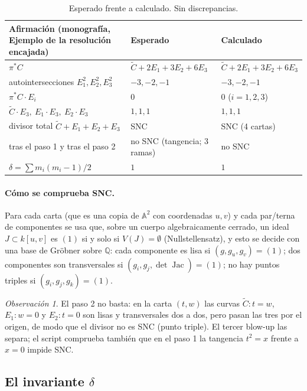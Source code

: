 \documentclass[11pt,a4paper]{article}
\newcommand{\A}{\mathbb{A}}
\newcommand{\QQ}{\mathbb{Q}}
\theoremstyle{plain}
\theoremstyle{definition}
\theoremstyle{remark}
\newtheorem{observacion}[teorema]{Observación}
\begin{document}
\begin{table}[ht]
\centering
\small
\begin{tabular}{@{}p{6.2cm} p{4.3cm} p{4.3cm}@{}}
\toprule
Afirmación (monografía, Ejemplo de la resolución encajada) & Esperado & Calculado \\
\midrule
$\pi^*C$ & $\tilde C+2E_1+3E_2+6E_3$ & $\tilde C+2E_1+3E_2+6E_3$ \\
autointersecciones $E_1^2,E_2^2,E_3^2$ & $-3,-2,-1$ & $-3,-2,-1$ \\
$\pi^*C\cdot E_i$ & $0$ & $0$ ($i=1,2,3$) \\
$\tilde C\cdot E_3,\ E_1\cdot E_3,\ E_2\cdot E_3$ & $1,1,1$ & $1,1,1$ \\
divisor total $\tilde C+E_1+E_2+E_3$ & SNC & SNC (4 cartas) \\
tras el paso 1 y tras el paso 2 & no SNC (tangencia; 3 ramas) & no SNC \\
$\delta=\sum m_i(m_i-1)/2$ & $1$ & $1$ \\
\bottomrule
\end{tabular}
\caption{Esperado frente a calculado. Sin discrepancias.}
\end{table}

\paragraph{Cómo se comprueba SNC.} Para cada carta (que es una copia de $\A^2$ con coordenadas $u,v$) y cada par/terna de componentes se usa que, sobre un cuerpo algebraicamente cerrado, un ideal $J\subset k[u,v]$ es $(1)$ si y solo si $V(J)=\emptyset$ (Nullstellensatz), y esto se decide con una base de Gröbner sobre $\QQ$: cada componente es lisa si $(g,g_u,g_v)=(1)$; dos componentes son transversales si $(g_i,g_j,\det\operatorname{Jac})=(1)$; no hay puntos triples si $(g_i,g_j,g_k)=(1)$.

\begin{observacion}
El paso 2 no basta: en la carta $(t,w)$ las curvas $\tilde C\colon t=w$, $E_1\colon w=0$ y $E_2\colon t=0$ son lisas y transversales dos a dos, pero pasan las tres por el origen, de modo que el divisor no es SNC (punto triple). El tercer blow-up las separa; el script comprueba también que en el paso 1 la tangencia $t^2=x$ frente a $x=0$ impide SNC.
\end{observacion}

\subsection{El invariante \texorpdfstring{$\delta$}{delta}}\label{sec:delta}
\end{document}
